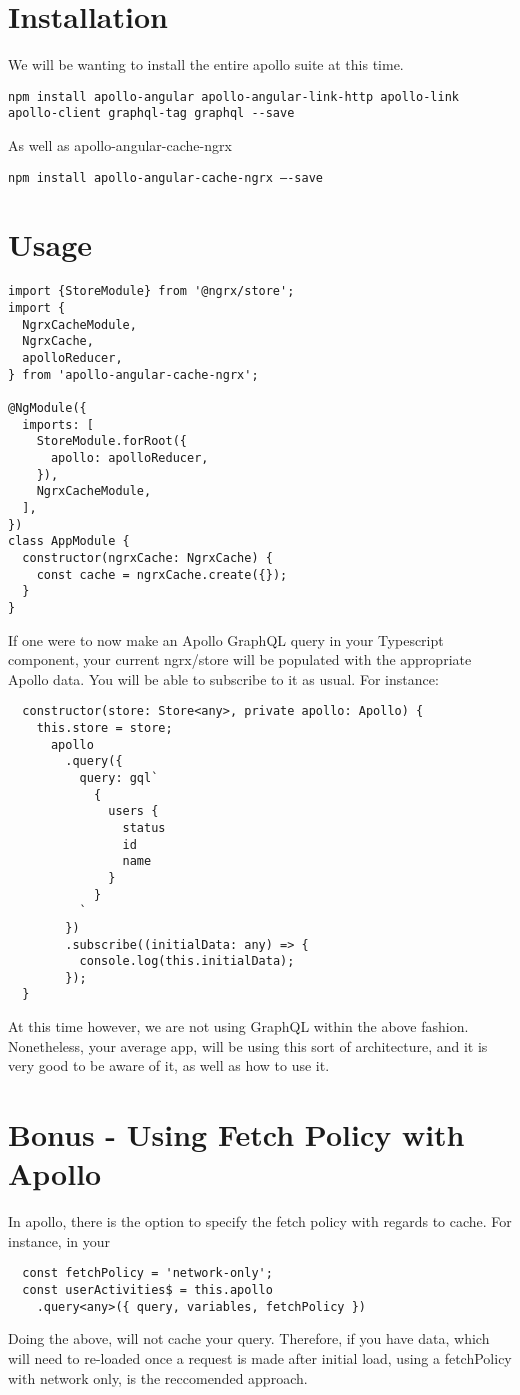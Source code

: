 \section{ Installation }
We will be wanting to install the entire apollo suite at this time.
\begin{lstlisting}
npm install apollo-angular apollo-angular-link-http apollo-link apollo-client graphql-tag graphql --save
\end{lstlisting}
As well as apollo-angular-cache-ngrx
\begin{lstlisting}
npm install apollo-angular-cache-ngrx —-save
\end{lstlisting}

\section{ Usage }
\begin{lstlisting}
import {StoreModule} from '@ngrx/store';
import {
  NgrxCacheModule,
  NgrxCache,
  apolloReducer,
} from 'apollo-angular-cache-ngrx';

@NgModule({
  imports: [
    StoreModule.forRoot({
      apollo: apolloReducer,
    }),
    NgrxCacheModule,
  ],
})
class AppModule {
  constructor(ngrxCache: NgrxCache) {
    const cache = ngrxCache.create({});
  }
}
\end{lstlisting}

If one were to now make an Apollo GraphQL query in your Typescript component,
your current ngrx/store will be populated with the appropriate Apollo data.
You will be able to subscribe to it as usual. For instance:
\begin{lstlisting}
  constructor(store: Store<any>, private apollo: Apollo) {
    this.store = store;
      apollo
        .query({
          query: gql`
            {
              users {
                status
                id
                name
              }
            }
          `
        })
        .subscribe((initialData: any) => {
          console.log(this.initialData);
        });
  }
\end{lstlisting}

At this time however, we are not using GraphQL within the above fashion.
Nonetheless, your average app, will be using this sort of architecture, and it
is very good to be aware of it, as well as how to use it.

\section{ Bonus - Using Fetch Policy with Apollo }
In apollo, there is the option to specify the fetch policy with regards to
cache. For instance, in your

\begin{lstlisting}
  const fetchPolicy = 'network-only';
  const userActivities$ = this.apollo
    .query<any>({ query, variables, fetchPolicy })
\end{lstlisting}

Doing the above, will not cache your query. Therefore, if you have data, which
will need to re-loaded once a request is made after initial load, using a
fetchPolicy with network only, is the reccomended approach.
